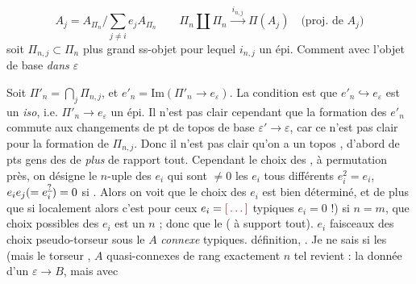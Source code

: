 \documentclass[11pt,a4paper]{article}
\begin{document}
\begin{enumerate}
    \[
      A_{j} = A_{\Pi_{n}} \Big/ \sum_{j \neq i} e_{j} A_{\Pi_{n}}
      \qquad
      \Pi_{n} \amalg \Pi_{n} \xrightarrow{\ i_{n,j}\ } \Pi(A_{j})
      \quad \text{(proj. de } A_{j}\text{)}
    \]
    soit $\Pi_{n,j} \subset \Pi_{n}$ plus grand ss-objet pour lequel
    $i_{n,j}$ un épi. Comment avec l'objet de base \emph{dans
    $\varepsilon$}
\end{enumerate}

Soit $\Pi'_{n} = \bigcap_{j} \Pi_{n,j}$, et $e'_{n} = \mathrm{Im}(\Pi'_{n}
\to e_{\varepsilon})$. La condition est que $e'_{n} \hookrightarrow
e_{\varepsilon}$ est un \emph{iso}, i.e. $\Pi'_{n} \to e_{\varepsilon}$
un épi. Il n'est pas clair cependant que la formation des $e'_{n}$ commute
aux changements de pt de topos de base $\varepsilon' \to \varepsilon$, car ce
n'est pas clair pour la formation de $\Pi_{n,j}$. Donc il n'est pas clair
qu'on a un topos  \struck{\ill{}}, d'abord de pts
\ill{} gens des \ill{} de \emph{plus} de rapport tout. Cependant le
choix des \ill{},  à permutation près, \struck{\ill{}}
on désigne le $n$-uple des $e_{i}$ qui sont $\neq 0$ \struck{\ill{}} les
$e_{i}$ \ill{} tous différents \ill{} $e_{i}^{2} = e_{i}$, $e_{i} e_{j}
(= e_{i}^{\uncertain{?}}) = 0$ si \ill{} \ill{} \ill{}. Alors on voit que le
choix des $e_{i}$ est bien déterminé, et de plus que si localement \ill{}
\ill{} \ill{} alors  c'est pour ceux $e_{i} =
\ill{}$ typiques $e_{i} = 0$ !) si $n = m$, \ill{} \ill{} que  choix possibles des $e_{i}$ \ill{} est un \ill{}
 \ill{} $n$ ; donc que \ill{} \ill{} le \ill{}
\emph{} \ill{} (\ill{} à support \struck{\ill{}}
tout). \struck{\ill{}} $e_{i}$ faisceaux des choix 
pseudo-torseur  sous le \struck{\ill{}} $A$ 
\emph{connexe} \add{\ill{}} typiques. \ill{} définition, \ill{}. Je ne
sais si les \ill{} (mais le torseur \ill{}, \ill{} \ill{} $A$
quasi-connexes de rang exactement $n$ \ill{} tel revient : la donnée
\struck{\ill{}} d'un $\varepsilon \to B$, mais \struck{\ill{}} avec
\end{document}
